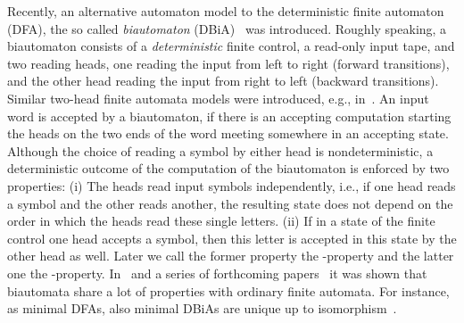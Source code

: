 \documentclass[submission]{eptcs}
\newcommand{\dfa}{\textrm{DFA}}
\newcommand{\dbia}{\textrm{DBiA}}
\begin{document}
Recently, an alternative automaton model to the deterministic finite
automaton (\dfa), the so called \emph{biautomaton}
(\dbia)~\cite{KlPo12} was introduced. Roughly speaking, a biautomaton
consists of a \emph{deterministic} finite control, a read-only input
tape, and two reading heads, one reading the input from left to right
(forward transitions), and the other head reading the input from right
to left (backward transitions). Similar two-head finite automata
models were introduced, e.g., in~\cite{CDJM13a,Lo07,Ro67}. An input
word is accepted by a biautomaton, if there is an accepting
computation starting the heads on the two ends of the word meeting
somewhere in an accepting state.  Although the choice of reading a
symbol by either head is nondeterministic, a deterministic outcome of
the computation of the biautomaton is enforced by two properties: (i)
The heads read input symbols independently, i.e., if one head reads a
symbol and the other reads another, the resulting state does not
depend on the order in which the heads read these single letters. (ii)
If in a state of the finite control one head accepts a symbol, then
this letter is accepted in this state by the other head as well.
Later we call the former property the -property and the
latter one the -property.  In~\cite{KlPo12} and a series of
forthcoming papers~\cite{HoJa13c,HoJa13a,JiKl12,KlPo12a} it was shown
that biautomata share a lot of properties with ordinary finite
automata. For instance, as minimal \dfa s, also minimal \dbia s are
unique up to isomorphism~\cite{Ar69,KlPo12}.
\end{document}
